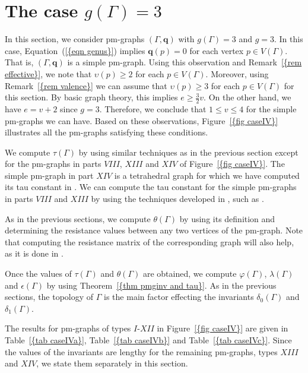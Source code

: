 \documentclass[12pt]{amsart}
\theoremstyle{example}
\theoremstyle{definition}
\theoremstyle{notation}
\begin{document}
\section{The case $g({\Gamma}) = 3$}\label{sec caseIV}

In this section, we consider pm-graphs $({\Gamma},{\textbf{q}})$ with $g({\Gamma}) = 3$ and $g=3$. In this case, {Equation~(\ref{{eqn genus}})} implies
${\textbf{q}} (p)=0$ for each vertex $p \in {V({\Gamma})}$. That is,  $({\Gamma},{\textbf{q}})$ is a simple pm-graph.
Using this observation and {Remark~\ref{{rem effective}}}, we note that ${\upsilon}(p) \geq 2$ for each $p \in {V({\Gamma})}$.
Moreover, using {Remark~\ref{{rem valence}}} we can assume that ${\upsilon}(p) \geq 3$ for each $p \in {V({\Gamma})}$ for this section.
By basic graph theory, this implies $e \geq \frac{3}{2}v$. On the other hand, we have $e=v+2$ since $g=3$.
Therefore, we conclude that $1 \leq v \leq 4$ for the simple pm-graphs we can have.
Based on these observations, {Figure~\ref{{fig caseIV}}} illustrates all the pm-graphs satisfying these conditions.

We compute ${\tau(\Gamma)}$ by using similar techniques as in the previous section except for the pm-graphs in parts $VIII$, $XIII$ and $XIV$ of {Figure~\ref{{fig caseIV}}}. The simple pm-graph in part $XIV$ is a tetrahedral graph for which we have computed its tau constant in \cite[Example 8.4]{C2}. We can compute the tau constant for the simple pm-graphs in parts  $VIII$ and $XIII$ by using the techniques developed in \cite{C2}, such as \cite[Corollaries 5.3 and 7.4, Propositions 4.6 and 4.5]{C2}.

As in the previous sections, we compute ${\theta ({\Gamma})}$ by using its definition and determining the resistance values between any two vertices of the pm-graph. Note that computing the resistance matrix of the corresponding graph will also help, as it is done in \cite[Example III]{ZCGreenFunction}.

Once the values of ${\tau(\Gamma)}$ and ${\theta ({\Gamma})}$ are obtained, we compute ${\varphi ({\Gamma})}$, ${\lambda ({\Gamma})}$ and ${\epsilon({\Gamma})}$ by using {Theorem~\ref{{thm pmginv and tau}}}.
As in the previous sections, the topology of ${\Gamma}$ is the main factor effecting the invariants $\delta_0({\Gamma})$ and $\delta_1({\Gamma})$.

The results for pm-graphs of types $I$-$XII$ in {Figure~\ref{{fig caseIV}}} are given in {Table~\ref{{tab caseIVa}}}, {Table~\ref{{tab caseIVb}}} and {Table~\ref{{tab caseIVc}}}. Since the values of the invariants are lengthy for the remaining pm-graphs, types $XIII$ and $XIV$, we state them separately in this section.
\end{document}
